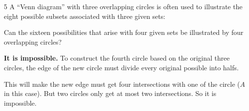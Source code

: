 \documentclass[a4paper,12pt]{article}
\makeatletter
\newtheorem*{solution}{Solution}
\theoremstyle{definition}
\renewenvironment{solution}[1][Solution] {\par\pushQED{\qed}\normalfont\topsep6\p@\@plus6\p@\relax\trivlist\item[\hskip\labelsep\bfseries#1\@addpunct{.}]\ignorespaces}{\popQED\endtrivlist\@endpefalse} \makeatother
\newenvironment{problems}{\begin{list}{}{\renewcommand{\makelabel}[1]{\textbf{##1}\hfil}}}{\end{list}}
\makeatother
\begin{document}
\begin{problems}
    \item[5] A ``Venn diagram'' with three overlapping circles is often used to illustrate the eight possible subsets associated with three given sets:
    
    

    Can the sixteen possibilities that arise with four given sets be illustrated by four overlapping circles?

    \begin{solution}
        \textbf{It is impossible.} To construct the fourth circle based on the original three circles, the edge of the new circle must divide every original possible into halfs.

        

        This will make the new edge must get four intersections with one of the circle ($A$ in this case). But two circles only get at most two intersections. So it is impossible.
    \end{solution}

\end{problems}
\end{document}
